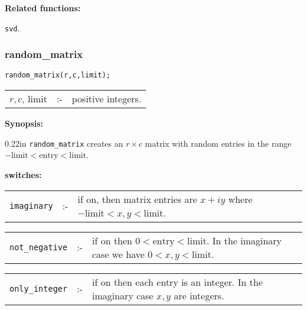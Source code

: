 {\bf Related functions:}

\hspace*{0.175in} {\tt svd}.

\subsubsection{random\_matrix}
\label{linalg:random_matrix}

\hspace*{0.175in} {\tt random\_matrix(r,c,limit);}

\hspace*{0.1in}  
\begin{tabular}{l l l} 
$r,c$, limit &:-& positive integers. \\
\end{tabular}

{\bf Synopsis:} %

\begin{addtolength}{\leftskip}{0.22in}
{\tt random\_matrix} creates an $r\times c$ matrix with random entries in the
range $-\text{limit} < \text{entry} < \text{limit}$.

\end{addtolength}

{\bf switches:}

\hspace*{0.1in} 
\begin{tabular}{l l l}
{\tt imaginary} \hspace*{0.175in} &:-& \parbox[t]{0.685\linewidth}{if 
on, then matrix entries are $x+iy$ where $-\text{limit} < x,y < \text{limit}$.} 
\end{tabular}

\vspace*{0.04in}
\hspace*{0.1in}
\begin{tabular}{l l l}
{\tt not\_negative} &:-& \parbox[t]{0.685\linewidth}{if on then $0 < 
\text{entry} < \text{limit}$. In the imaginary case we have $0<x,y<\text{limit}$.} 
\end{tabular}

\vspace*{0.04in}
\hspace*{0.1in}
\begin{tabular}{l l l}
{\tt only\_integer} &:-& \parbox[t]{0.685\linewidth}{if on then each 
entry is an integer. In the imaginary case $x,y$ are integers.} 
\end{tabular}

